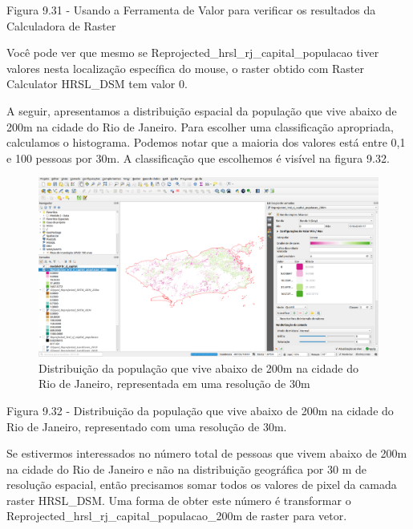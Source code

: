 \documentclass[
  portuguese,
]{krantz}
\begin{document}
Figura 9.31 - Usando a Ferramenta de Valor para verificar os resultados da Calculadora de Raster

Você pode ver que mesmo se Reprojected\_hrsl\_rj\_capital\_populacao tiver valores nesta localização específica do mouse, o raster obtido com Raster Calculator HRSL\_DSM tem valor 0.

A seguir, apresentamos a distribuição espacial da população que vive abaixo de 200m na \hspace{0pt}\hspace{0pt}cidade do Rio de Janeiro. Para escolher uma classificação apropriada, calculamos o histograma. Podemos notar que a maioria dos valores está entre 0,1 e 100 pessoas por 30m. A classificação que escolhemos é visível na figura 9.32.

\begin{figure}
\centering
\includegraphics{media/modulo9/fig932.png}
\caption{Distribuição da população que vive abaixo de 200m na \hspace{0pt}\hspace{0pt}cidade do Rio de Janeiro, representada em uma resolução de 30m}
\end{figure}

Figura 9.32 - Distribuição da população que vive abaixo de 200m na \hspace{0pt}\hspace{0pt}cidade do Rio de Janeiro, representado com uma resolução de 30m.

Se estivermos interessados \hspace{0pt}\hspace{0pt}no número total de pessoas que vivem abaixo de 200m na \hspace{0pt}\hspace{0pt}cidade do Rio de Janeiro e não na distribuição geográfica por 30 m de resolução espacial, então precisamos somar todos os valores de pixel da camada raster HRSL\_DSM. Uma forma de obter este número é transformar o Reprojected\_hrsl\_rj\_capital\_populacao\_200m de raster para vetor.
\end{document}

